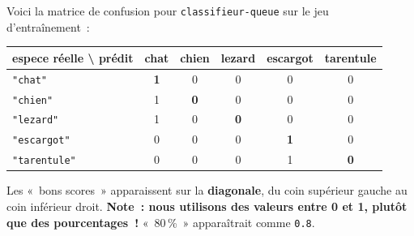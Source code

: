 \documentclass[12pt,a4paper]{article}
\begin{document}
\begin{keypointbox}
  Voici la matrice de confusion pour \texttt{classifieur-queue} sur le jeu d'entraînement~:

  \vspace{0.4em}
  \begin{center}
  \small
  \begin{tabular}{l|c|c|c|c|c}
    \toprule
    \textbf{espece réelle} \textbackslash{} \textbf{prédit} & chat & chien & lezard & escargot & tarentule \\
    \midrule
    \texttt{"chat"}      & \cellcolor{tp!20}\textbf{1} & 0 & 0 & 0 & 0 \\
    \texttt{"chien"}     & 1 & \cellcolor{tp!20}\textbf{0} & 0 & 0 & 0 \\
    \texttt{"lezard"}    & 1 & 0 & \cellcolor{tp!20}\textbf{0} & 0 & 0 \\
    \texttt{"escargot"}  & 0 & 0 & 0 & \cellcolor{tp!20}\textbf{1} & 0 \\
    \texttt{"tarentule"} & 0 & 0 & 0 & 1 & \cellcolor{tp!20}\textbf{0} \\
    \bottomrule
  \end{tabular}
  \end{center}

  \vspace{0.3em}
  Les «~bons scores~» apparaissent sur la \textbf{diagonale}, du coin supérieur gauche au coin inférieur droit. \textbf{Note~: nous utilisons des valeurs entre 0 et 1, plutôt que des pourcentages~!} «~80\,\%~» apparaîtrait comme \texttt{0.8}.
\end{keypointbox}
\end{document}
